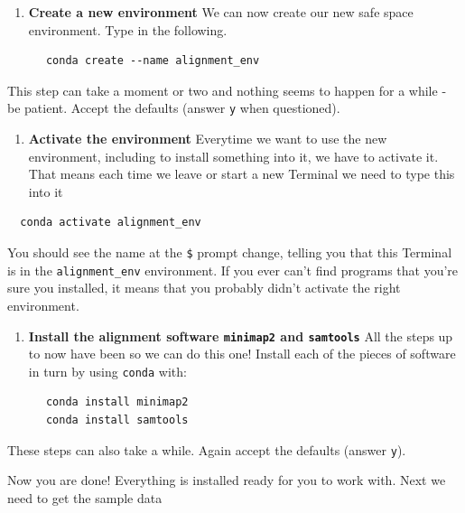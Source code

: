 \documentclass[]{book}
\providecommand{\tightlist}{%
  \setlength{\itemsep}{0pt}\setlength{\parskip}{0pt}}
\begin{document}
\begin{enumerate}
\def\labelenumi{\arabic{enumi}.}
\setcounter{enumi}{2}
\tightlist
\item
  \textbf{Create a new environment}
  We can now create our new safe space environment. Type in the following.
\end{enumerate}

\begin{verbatim}
      conda create --name alignment_env
\end{verbatim}

This step can take a moment or two and nothing seems to happen for a while - be patient. Accept the defaults (answer \texttt{y} when questioned).

\begin{enumerate}
\def\labelenumi{\arabic{enumi}.}
\setcounter{enumi}{3}
\tightlist
\item
  \textbf{Activate the environment}
  Everytime we want to use the new environment, including to install something into it, we have to activate it. That means each time we leave or start a new Terminal we need to type this into it
\end{enumerate}

\begin{verbatim}
  conda activate alignment_env
\end{verbatim}

You should see the name at the \texttt{\$} prompt change, telling you that this Terminal is in the \texttt{alignment\_env} environment. If you ever can't find programs that you're sure you installed, it means that you probably didn't activate the right environment.

\begin{enumerate}
\def\labelenumi{\arabic{enumi}.}
\setcounter{enumi}{4}
\tightlist
\item
  \textbf{Install the alignment software \texttt{minimap2} and \texttt{samtools}}
  All the steps up to now have been so we can do this one! Install each of the pieces of software in turn by using \texttt{conda} with:
\end{enumerate}

\begin{verbatim}
      conda install minimap2
      conda install samtools
\end{verbatim}

These steps can also take a while. Again accept the defaults (answer \texttt{y}).

Now you are done! Everything is installed ready for you to work with. Next we need to get the sample data
\end{document}
